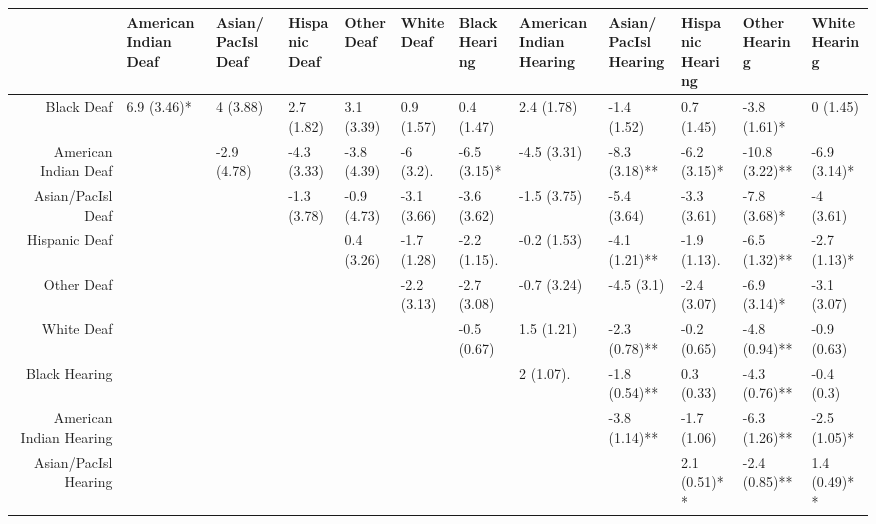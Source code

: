 \documentclass{article}\usepackage[]{graphicx}\usepackage[]{color}
\begin{document}
\begin{landscape}
\begin{table}[ht]
\centering
\begingroup\small
\begin{tabular}{rlllllllllll}
  \hline
 & \thead{American Indian\\Deaf} & \thead{Asian/PacIsl\\Deaf} & \thead{Hispanic\\Deaf} & \thead{Other\\Deaf} & \thead{White\\Deaf} & \thead{Black\\Hearing} & \thead{American Indian\\Hearing} & \thead{Asian/PacIsl\\Hearing} & \thead{Hispanic\\Hearing} & \thead{Other\\Hearing} & \thead{White\\Hearing} \\
  \hline
Black Deaf & 6.9 (3.46)* & 4 (3.88) & 2.7 (1.82) & 3.1 (3.39) & 0.9 (1.57) & 0.4 (1.47) & 2.4 (1.78) & -1.4 (1.52) & 0.7 (1.45) & -3.8 (1.61)* & 0 (1.45) \\
  American Indian Deaf &  & -2.9 (4.78) & -4.3 (3.33) & -3.8 (4.39) & -6 (3.2). & -6.5 (3.15)* & -4.5 (3.31) & -8.3 (3.18)** & -6.2 (3.15)* & -10.8 (3.22)** & -6.9 (3.14)* \\
  Asian/PacIsl Deaf &  &  & -1.3 (3.78) & -0.9 (4.73) & -3.1 (3.66) & -3.6 (3.62) & -1.5 (3.75) & -5.4 (3.64) & -3.3 (3.61) & -7.8 (3.68)* & -4 (3.61) \\
  Hispanic Deaf &  &  &  & 0.4 (3.26) & -1.7 (1.28) & -2.2 (1.15). & -0.2 (1.53) & -4.1 (1.21)** & -1.9 (1.13). & -6.5 (1.32)** & -2.7 (1.13)* \\
  Other Deaf &  &  &  &  & -2.2 (3.13) & -2.7 (3.08) & -0.7 (3.24) & -4.5 (3.1) & -2.4 (3.07) & -6.9 (3.14)* & -3.1 (3.07) \\
  White Deaf &  &  &  &  &  & -0.5 (0.67) & 1.5 (1.21) & -2.3 (0.78)** & -0.2 (0.65) & -4.8 (0.94)** & -0.9 (0.63) \\
  Black Hearing &  &  &  &  &  &  & 2 (1.07). & -1.8 (0.54)** & 0.3 (0.33) & -4.3 (0.76)** & -0.4 (0.3) \\
  American Indian Hearing &  &  &  &  &  &  &  & -3.8 (1.14)** & -1.7 (1.06) & -6.3 (1.26)** & -2.5 (1.05)* \\
  Asian/PacIsl Hearing &  &  &  &  &  &  &  &  & 2.1 (0.51)** & -2.4 (0.85)** & 1.4 (0.49)** \\

\end{tabular}
\end{table}
\end{landscape}
\end{document}
